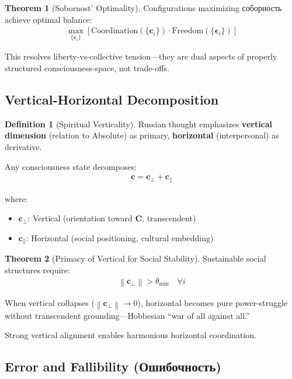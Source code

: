 \documentclass[11pt,a4paper]{article}
\theoremstyle{definition}
\newtheorem{definition}{Definition}[section]
\newtheorem{theorem}{Theorem}[section]
\theoremstyle{remark}
\newcommand{\cc}{\mathbf{c}}
\newcommand{\norm}[1]{\left\|#1\right\|}
\begin{document}
\begin{theorem}[Sobornost' Optimality]
Configurations maximizing соборность achieve optimal balance:
\begin{align}
\max_{\{\cc_i\}} \left[ \text{Coordination}(\{\cc_i\}) \cdot \text{Freedom}(\{\boldsymbol{\epsilon}_i\}) \right]
\end{align}

This resolves liberty-vs-collective tension—they are dual aspects of properly structured consciousness-space, not trade-offs.
\end{theorem}

\subsection{Vertical-Horizontal Decomposition}

\begin{definition}[Spiritual Verticality]
Russian thought emphasizes \textbf{vertical dimension} (relation to Absolute) as primary, \textbf{horizontal} (interpersonal) as derivative.

Any consciousness state decomposes:
\begin{align}
\cc = \cc_{\perp} + \cc_{\parallel}
\end{align}

where:
\begin{itemize}
\item \(\cc_{\perp}\): Vertical (orientation toward \(\mathbf{C}\), transcendent)
\item \(\cc_{\parallel}\): Horizontal (social positioning, cultural embedding)
\end{itemize}
\end{definition}

\begin{theorem}[Primacy of Vertical for Social Stability]
Sustainable social structures require:
\begin{align}
\norm{\cc_{\perp}} > \theta_{\min} \quad \forall i
\end{align}

When vertical collapses (\(\norm{\cc_{\perp}} \to 0\)), horizontal becomes pure power-struggle without transcendent grounding—Hobbesian ``war of all against all.''

Strong vertical alignment enables harmonious horizontal coordination.
\end{theorem}

\subsection{Error and Fallibility (Ошибочность)}
\end{document}
